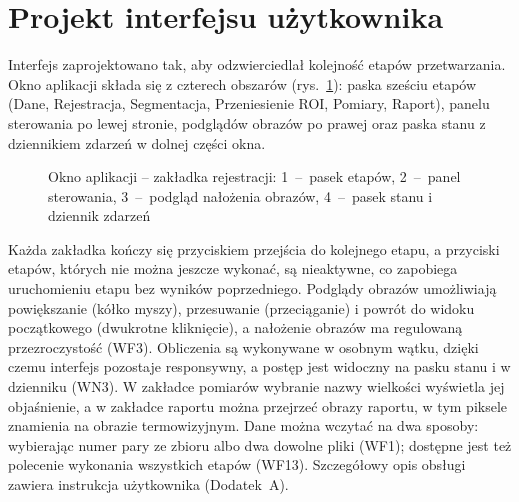 \section{Projekt interfejsu użytkownika}
\label{sec:interfejs}

Interfejs zaprojektowano tak, aby odzwierciedlał kolejność etapów przetwarzania. Okno aplikacji składa się z czterech obszarów (rys.~\ref{fig:interfejs}): paska sześciu etapów (Dane, Rejestracja, Segmentacja, Przeniesienie ROI, Pomiary, Raport), panelu sterowania po lewej stronie, podglądów obrazów po prawej oraz paska stanu z dziennikiem zdarzeń w dolnej części okna.

\begin{figure}[htbp]
  \centering
  \caption{Okno aplikacji -- zakładka rejestracji: 1~--~pasek etapów, 2~--~panel sterowania, 3~--~podgląd nałożenia obrazów, 4~--~pasek stanu i dziennik zdarzeń}
  \label{fig:interfejs}
\end{figure}

Każda zakładka kończy się przyciskiem przejścia do kolejnego etapu, a przyciski etapów, których nie można jeszcze wykonać, są nieaktywne, co zapobiega uruchomieniu etapu bez wyników poprzedniego. Podglądy obrazów umożliwiają powiększanie (kółko myszy), przesuwanie (przeciąganie) i powrót do widoku początkowego (dwukrotne kliknięcie), a nałożenie obrazów ma regulowaną przezroczystość (WF3). Obliczenia są wykonywane w osobnym wątku, dzięki czemu interfejs pozostaje responsywny, a postęp jest widoczny na pasku stanu i w dzienniku (WN3). W zakładce pomiarów wybranie nazwy wielkości wyświetla jej objaśnienie, a w zakładce raportu można przejrzeć obrazy raportu, w tym piksele znamienia na obrazie termowizyjnym. Dane można wczytać na dwa sposoby: wybierając numer pary ze zbioru albo dwa dowolne pliki (WF1); dostępne jest też polecenie wykonania wszystkich etapów (WF13). Szczegółowy opis obsługi zawiera instrukcja użytkownika (Dodatek~A).
